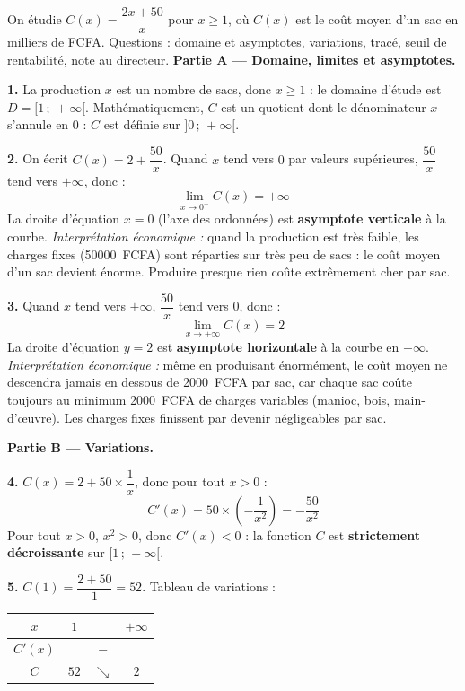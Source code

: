 \documentclass[11pt]{article}
\newcounter{popsec}
\newcounter{popsub}
\newcommand{\courssub}[1]{%
  \stepcounter{popsub}%
  \par\vspace{9pt}\noindent{\popxbold\fontsize{11.5}{13}\selectfont\color{popink}{\color{poporange}\thepopsec.\thepopsub}\hspace{6pt}#1}\par\nopagebreak\vspace{4pt}
}
\begin{document}
\courssub{Démarche et corrigé commenté}

\begin{exoresolu}
On étudie $C(x) = \dfrac{2x+50}{x}$ pour $x \geq 1$, où $C(x)$ est le coût moyen d'un sac en milliers de FCFA. Questions : domaine et asymptotes, variations, tracé, seuil de rentabilité, note au directeur.
\tcblower
\textbf{Partie A — Domaine, limites et asymptotes.}

\textbf{1.} La production $x$ est un nombre de sacs, donc $x \geq 1$ : le domaine d'étude est $D = [1\,;\,+\infty[$. Mathématiquement, $C$ est un quotient dont le dénominateur $x$ s'annule en $0$ : $C$ est définie sur $]0\,;\,+\infty[$.

\textbf{2.} On écrit $C(x) = 2 + \dfrac{50}{x}$. Quand $x$ tend vers $0$ par valeurs supérieures, $\dfrac{50}{x}$ tend vers $+\infty$, donc :
\[ \lim_{x \to 0^{+}} C(x) = +\infty \]
La droite d'équation $x = 0$ (l'axe des ordonnées) est \textbf{asymptote verticale} à la courbe.
\emph{Interprétation économique :} quand la production est très faible, les charges fixes (\SI{50000}{FCFA}) sont réparties sur très peu de sacs : le coût moyen d'un sac devient énorme. Produire presque rien coûte extrêmement cher par sac.

\textbf{3.} Quand $x$ tend vers $+\infty$, $\dfrac{50}{x}$ tend vers $0$, donc :
\[ \lim_{x \to +\infty} C(x) = 2 \]
La droite d'équation $y = 2$ est \textbf{asymptote horizontale} à la courbe en $+\infty$.
\emph{Interprétation économique :} même en produisant énormément, le coût moyen ne descendra jamais en dessous de \SI{2000}{FCFA} par sac, car chaque sac coûte toujours au minimum \SI{2000}{FCFA} de charges variables (manioc, bois, main-d'œuvre). Les charges fixes finissent par devenir négligeables par sac.

\textbf{Partie B — Variations.}

\textbf{4.} $C(x) = 2 + 50 \times \dfrac{1}{x}$, donc pour tout $x > 0$ :
\[ C'(x) = 50 \times \left(-\frac{1}{x^{2}}\right) = -\frac{50}{x^{2}} \]
Pour tout $x > 0$, $x^{2} > 0$, donc $C'(x) < 0$ : la fonction $C$ est \textbf{strictement décroissante} sur $[1\,;\,+\infty[$.

\textbf{5.} $C(1) = \dfrac{2 + 50}{1} = 52$. Tableau de variations :

\begin{center}
\begin{tabular}{|c|ccc|}
\hline
$x$ & $1$ & & $+\infty$ \\ \hline
$C'(x)$ & & $-$ & \\ \hline
$C$ & $52$ & $\searrow$ & $2$ \\ \hline
\end{tabular}
\end{center}


\end{exoresolu}
\end{document}
